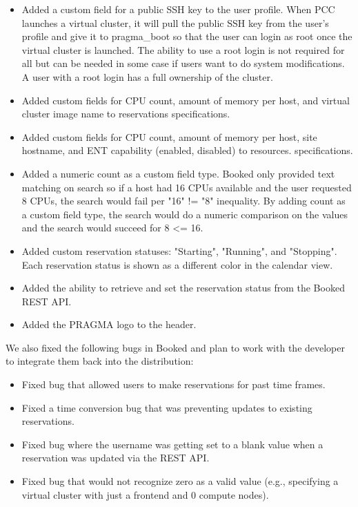 \documentclass{acm_proc_article-sp}
\begin{document}
\begin{itemize}
\item Added a custom field for a public SSH key  to the user profile.  When PCC launches a virtual cluster, it will pull the public SSH key from the user's  profile and give it to pragma\_boot so that the user can login as root once the virtual cluster is launched.   The ability to use a root login is not required for all but can be needed in some case if users want to do system modifications. A user with a root login has a full ownership of the cluster. 
\item Added custom fields for CPU count, amount of memory per host, and virtual cluster image name to reservations specifications.
\item Added custom fields for CPU count, amount of memory per host, site hostname, and ENT capability (enabled, disabled) to resources. specifications.
\item Added a numeric count as a custom field type.  Booked only provided text matching on search so if a host had 16 CPUs available and the user requested 8 CPUs, the search would fail per "16" != "8" inequality.  By adding count as a custom field type, the search would do a numeric comparison on the values and the search would succeed for 8 <= 16.
\item Added custom reservation statuses: "Starting", "Running", and "Stopping".  Each reservation status is shown as a different color in  the calendar view.
\item Added the ability to retrieve and set the reservation status from the Booked REST API.  	
\item Added the PRAGMA logo to the header.
\end{itemize}

We also fixed the following bugs in Booked and plan to work with the developer to integrate them back into the distribution:

\begin{itemize}
\item Fixed bug that allowed users to make reservations for past time frames.
\item Fixed a time conversion bug that was preventing updates to existing reservations.
\item Fixed bug where the username was getting set to a blank value when a reservation was updated via the REST API. 
\item Fixed bug that would not recognize zero as a valid value (e.g., specifying a virtual cluster with just a frontend and 0 compute nodes).  
\end{itemize}
\end{document}
